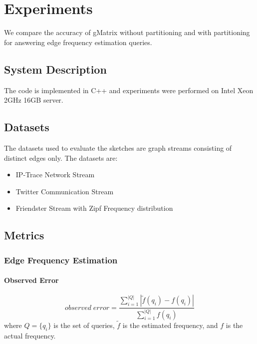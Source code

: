 \chapter{Experiments}

\ifpdf
    \graphicspath{{Chapter3/Figs/Raster/}{Chapter3/Figs/PDF/}{Chapter3/Figs/}}
\else
    \graphicspath{{Chapter3/Figs/Vector/}{Chapter3/Figs/}}
\fi

We compare the accuracy of gMatrix without partitioning and with partitioning for answering edge frequency estimation queries.

\section{System Description}
The code is implemented in C++ and experiments were performed on Intel Xeon 2GHz 16GB server.

\section{Datasets}
The datasets used to evaluate the sketches are graph streams consisting of distinct edges only. The datasets are:
\begin{itemize}
\item IP-Trace Network Stream \cite{khan}
\item Twitter Communication Stream \cite{khan}
\item Friendster Stream with Zipf Frequency distribution \cite{khan}
\end{itemize}

\section{Metrics}
\subsection{Edge Frequency Estimation}
\subsubsection{Observed Error \cite{khan}}
\[
observed\;error = \frac{ \sum_{i=1}^{|Q|}{|\tilde{f}(q_i) - f(q_i)|} }{\sum_{i=1}^{|Q|}f(q_i)}
\]
where $Q = \{q_i\}$ is the set of queries, $\tilde{f}$ is the estimated frequency, and $f$ is the actual frequency.


